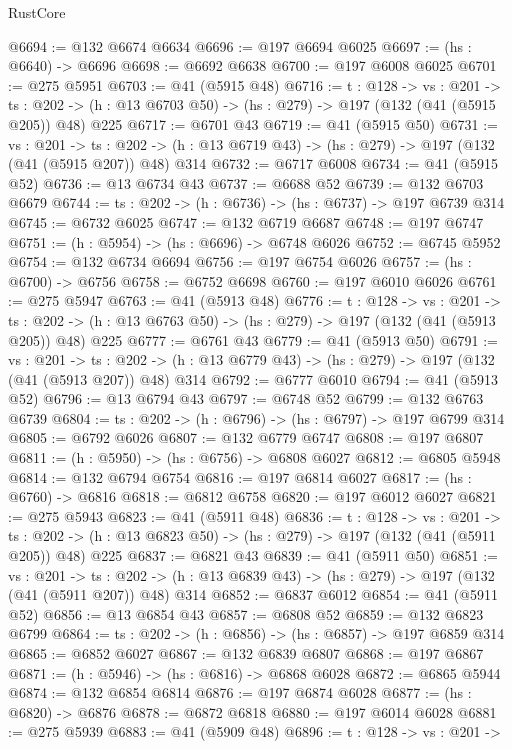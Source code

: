 \begin{lexlean}{RustCore}
\begin{coremodule}
@6694 := @132 @6674 @6634
@6696 := @197 @6694 @6025
@6697 := (hs : @6640) -> @6696
@6698 := @6692 @6638
@6700 := @197 @6008 @6025
@6701 := @275 @5951
@6703 := @41 (@5915 @48)
@6716 := {t : @128} ->
  {vs : @201} ->
  {ts : @202} -> (h : @13 @6703 @50) -> (hs : @279) -> @197 (@132 (@41 (@5915 @205)) @48) @225
@6717 := @6701 @43
@6719 := @41 (@5915 @50)
@6731 := {vs : @201} ->
  {ts : @202} -> (h : @13 @6719 @43) -> (hs : @279) -> @197 (@132 (@41 (@5915 @207)) @48) @314
@6732 := @6717 @6008
@6734 := @41 (@5915 @52)
@6736 := @13 @6734 @43
@6737 := @6688 @52
@6739 := @132 @6703 @6679
@6744 := {ts : @202} -> (h : @6736) -> (hs : @6737) -> @197 @6739 @314
@6745 := @6732 @6025
@6747 := @132 @6719 @6687
@6748 := @197 @6747
@6751 := (h : @5954) -> (hs : @6696) -> @6748 @6026
@6752 := @6745 @5952
@6754 := @132 @6734 @6694
@6756 := @197 @6754 @6026
@6757 := (hs : @6700) -> @6756
@6758 := @6752 @6698
@6760 := @197 @6010 @6026
@6761 := @275 @5947
@6763 := @41 (@5913 @48)
@6776 := {t : @128} ->
  {vs : @201} ->
  {ts : @202} -> (h : @13 @6763 @50) -> (hs : @279) -> @197 (@132 (@41 (@5913 @205)) @48) @225
@6777 := @6761 @43
@6779 := @41 (@5913 @50)
@6791 := {vs : @201} ->
  {ts : @202} -> (h : @13 @6779 @43) -> (hs : @279) -> @197 (@132 (@41 (@5913 @207)) @48) @314
@6792 := @6777 @6010
@6794 := @41 (@5913 @52)
@6796 := @13 @6794 @43
@6797 := @6748 @52
@6799 := @132 @6763 @6739
@6804 := {ts : @202} -> (h : @6796) -> (hs : @6797) -> @197 @6799 @314
@6805 := @6792 @6026
@6807 := @132 @6779 @6747
@6808 := @197 @6807
@6811 := (h : @5950) -> (hs : @6756) -> @6808 @6027
@6812 := @6805 @5948
@6814 := @132 @6794 @6754
@6816 := @197 @6814 @6027
@6817 := (hs : @6760) -> @6816
@6818 := @6812 @6758
@6820 := @197 @6012 @6027
@6821 := @275 @5943
@6823 := @41 (@5911 @48)
@6836 := {t : @128} ->
  {vs : @201} ->
  {ts : @202} -> (h : @13 @6823 @50) -> (hs : @279) -> @197 (@132 (@41 (@5911 @205)) @48) @225
@6837 := @6821 @43
@6839 := @41 (@5911 @50)
@6851 := {vs : @201} ->
  {ts : @202} -> (h : @13 @6839 @43) -> (hs : @279) -> @197 (@132 (@41 (@5911 @207)) @48) @314
@6852 := @6837 @6012
@6854 := @41 (@5911 @52)
@6856 := @13 @6854 @43
@6857 := @6808 @52
@6859 := @132 @6823 @6799
@6864 := {ts : @202} -> (h : @6856) -> (hs : @6857) -> @197 @6859 @314
@6865 := @6852 @6027
@6867 := @132 @6839 @6807
@6868 := @197 @6867
@6871 := (h : @5946) -> (hs : @6816) -> @6868 @6028
@6872 := @6865 @5944
@6874 := @132 @6854 @6814
@6876 := @197 @6874 @6028
@6877 := (hs : @6820) -> @6876
@6878 := @6872 @6818
@6880 := @197 @6014 @6028
@6881 := @275 @5939
@6883 := @41 (@5909 @48)
@6896 := {t : @128} ->
  {vs : @201} ->

\end{coremodule}
\end{lexlean}
